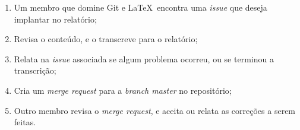 \begin{enumerate}
  \item Um membro que domine Git e \LaTeX\ encontra uma \textit{issue} que deseja
  implantar no relatório;
  \item Revisa o conteúdo, e o transcreve para o relatório;
  \item Relata na \textit{issue} associada se algum problema ocorreu, ou se terminou a transcrição;
  \item Cria um \textit{merge request} para a \textit{branch master} no repositório;
  \item Outro membro revisa o \textit{merge request}, e aceita ou relata as correções a serem feitas.
\end{enumerate}

